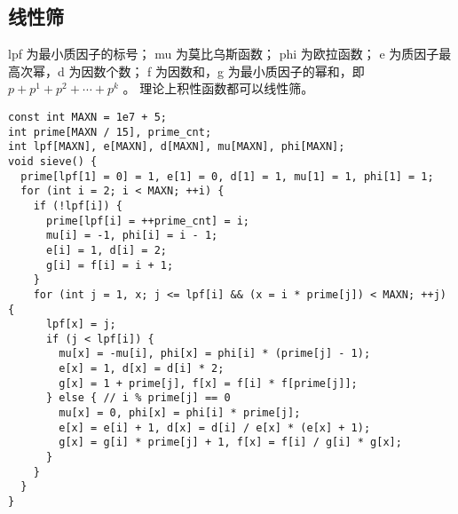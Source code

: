 \subsection{线性筛}
lpf 为最小质因子的标号；
mu 为莫比乌斯函数；
phi 为欧拉函数；
e 为质因子最高次幂，d 为因数个数；
f 为因数和，g 为最小质因子的幂和，即 $p + p^{1} + p^{2} + \cdots + p^{k}$ 。
理论上积性函数都可以线性筛。

\begin{lstlisting}
const int MAXN = 1e7 + 5;
int prime[MAXN / 15], prime_cnt;
int lpf[MAXN], e[MAXN], d[MAXN], mu[MAXN], phi[MAXN];
void sieve() {
  prime[lpf[1] = 0] = 1, e[1] = 0, d[1] = 1, mu[1] = 1, phi[1] = 1;
  for (int i = 2; i < MAXN; ++i) {
    if (!lpf[i]) {
      prime[lpf[i] = ++prime_cnt] = i;
      mu[i] = -1, phi[i] = i - 1;
      e[i] = 1, d[i] = 2;
      g[i] = f[i] = i + 1;
    }
    for (int j = 1, x; j <= lpf[i] && (x = i * prime[j]) < MAXN; ++j) {
      lpf[x] = j;
      if (j < lpf[i]) {
        mu[x] = -mu[i], phi[x] = phi[i] * (prime[j] - 1);
        e[x] = 1, d[x] = d[i] * 2;
        g[x] = 1 + prime[j], f[x] = f[i] * f[prime[j]];
      } else { // i % prime[j] == 0
        mu[x] = 0, phi[x] = phi[i] * prime[j];
        e[x] = e[i] + 1, d[x] = d[i] / e[x] * (e[x] + 1);
        g[x] = g[i] * prime[j] + 1, f[x] = f[i] / g[i] * g[x];
      }
    }
  }
}
\end{lstlisting}
